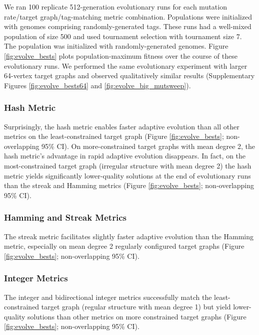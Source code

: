 We ran 100 replicate 512-generation evolutionary runs for each mutation rate/target graph/tag-matching metric combination.
Populations were initialized with genomes comprising randomly-generated tags.
These runs had a well-mixed population of size 500 and used tournament selection with tournament size 7.
The population was initialized with randomly-generated genomes.
Figure \ref{fig:evolve_bests} plots population-maximum fitness over the course of these evolutionary runs.
We performed the same evolutionary experiment with larger 64-vertex target graphs and observed qualitatively similar results (Supplementary Figures \ref{fig:evolve_bests64} and \ref{fig:evolve_big_mutsweep}).

\subsubsection{Hash Metric}

Surprisingly, the hash metric enables faster adaptive evolution than all other metrics on the least-constrained target graph (Figure \ref{fig:evolve_bests}; non-overlapping 95\% CI).
On more-constrained target graphs with mean degree 2, the hash metric's advantage in rapid adaptive evolution disappears.
In fact, on the most-constrained target graph (irregular structure with mean degree 2) the hash metric yields significantly lower-quality solutions at the end of evolutionary runs than the streak and Hamming metrics (Figure \ref{fig:evolve_bests}; non-overlapping 95\% CI).

\subsubsection{Hamming and Streak Metrics}

The streak metric facilitates slightly faster adaptive evolution than the Hamming metric, especially on mean degree 2 regularly configured target graphs (Figure \ref{fig:evolve_bests}; non-overlapping 95\% CI).

\subsubsection{Integer Metrics}

The integer and bidirectional integer metrics successfully match the least-constrained target graph (regular structure with mean degree 1) but yield lower-quality solutions than other metrics on more constrained target graphs (Figure \ref{fig:evolve_bests}; non-overlapping 95\% CI).

